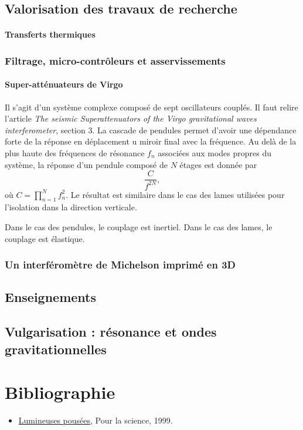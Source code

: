 \documentclass[12pt,a4paper]{article}
\begin{document}
\subsection{Valorisation des travaux de recherche}

\paragraph{Transferts thermiques\\}

\subsubsection{Filtrage, micro-contrôleurs et asservissements}
\label{sec:controls}

\paragraph{Super-atténuateurs de Virgo\\}

Il s'agit d'un système complexe composé de sept oscillateurs couplés.
Il faut relire l'article \emph{The seismic Superattenuators of the Virgo gravitational waves interferometer}, section 3.
La cascade de pendules permet d'avoir une dépendance forte de la réponse en déplacement u miroir final avec la fréquence.
Au delà de la plus haute des fréquences de résonance $f_n$ associées aux modes propres du système, la réponse d'un pendule composé de $N$ étages est donnée par
\begin{equation}
\frac{C}{f^{2N}},
\end{equation}
où $C = \prod_{n=1}^N f_n^2$.
Le résultat est similaire dans le cas des lames utilisées pour l'isolation dans la direction verticale.

Dans le cas des pendules, le couplage est inertiel.
Dans le cas des lames, le couplage est élastique.


\subsubsection{Un interféromètre de Michelson imprimé en 3D}

\subsection{Enseignements}

\subsection{Vulgarisation : résonance et ondes gravitationnelles}

\section*{Bibliographie}

\begin{itemize}
\item \href{https://www.pourlascience.fr/sd/physique/lumineuses-poussees-1143.php}{Lumineuses pousées}, Pour la science, 1999.
\end{itemize}
\end{document}
